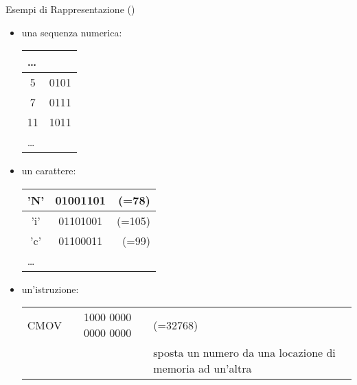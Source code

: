 \setcounter{ms}{1}
\begin{slide}{Esempi di Rappresentazione ()}
{
	\begin{itemize}

		\item una sequenza numerica:\hfill
		{\tiny
			\begin{tabular}{| c | c |}
				\hline
				\multicolumn{2}{|l|}{\ldots}\\
				\hline
				5 & 0101 \\
				\hline
				7 & 0111 \\
				\hline
				11 & 1011\\
				\hline
				\multicolumn{2}{|l|}{\ldots}\\
				\hline
			\end{tabular}
		}

		\item un carattere:\hfill
		{\tiny
			\begin{tabular}{| c | c | r |}
				\hline
				'N' & 01001101 & (=78)\\
				\hline
				'i' & 01101001 & (=105)\\
				\hline
				'c' & 01100011 & (=99)\\
				\hline
				\multicolumn{3}{|l|}{\ldots}\\
				\hline
			\end{tabular}
		}

		\item un'istruzione:\hfill
		{\tiny
			\begin{tabular}{| c | c | p{} |}
				\hline
				CMOV & 1000 0000 0000 0000 & (=32768) \\
				     &                     & sposta un numero da una
			                                 locazione di memoria ad
											 un'altra\\
				\hline
			\end{tabular}
		}

	\end{itemize}

}
\end{slide}

